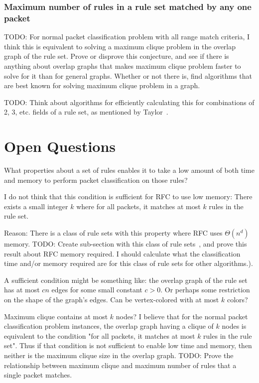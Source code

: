 \documentclass[acmsmall]{acmart}
\newcommand{\todo}[1]{}
\renewcommand{\todo}[1]{{\color{red} TODO: {#1}}}
\begin{document}
\subsubsection{Maximum number of rules in a rule set matched by any one packet}

\todo{For normal packet classification problem with all range match criteria, I think this is equivalent to solving a maximum clique problem in the overlap graph of the rule set.  Prove or disprove this conjecture, and see if there is anything about overlap graphs that makes maximum clique problem faster to solve for it than for general graphs.  Whether or not there is, find algorithms that are best known for solving maximum clique problem in a graph.}

\todo{Think about algorithms for efficiently calculating this for combinations of 2, 3, etc. fields of a rule set, as mentioned by Taylor~\cite[Sec 2.2]{TT2004b}.}


\section{Open Questions}

What properties about a set of rules enables it
to take a low amount of both time and memory to perform
packet classification on those rules?

I do not think that this condition is sufficient for RFC to use low memory:
There exists a small integer $k$ where for all packets,
it matches at most $k$ rules in the rule set.

Reason: There is a class of rule sets with this property where RFC uses
$\Theta(n^d)$ memory.
\todo{Create sub-section with this class of rule sets~\cite[Sec 4.2]{ASP1999},
and prove this result about RFC memory required.
I should calculate what the classification time and/or
memory required are for this class of rule sets for other algorithms.}).

A sufficient condition might be something like:
the overlap graph of the rule set has at most $cn$ edges for some small constant $c > 0$.
Or perhaps some restriction on the shape of the graph's edges.
Can be vertex-colored with at most $k$ colors?

Maximum clique contains at most $k$ nodes?
I believe that for the normal packet classification problem instances,
the overlap graph having a clique of $k$ nodes is
equivalent to the condition
"for all packets, it matches at most $k$ rules in the rule set".
Thus if that condition is not sufficient to enable low time and memory,
then neither is the maximum clique size in the overlap graph.
\todo{Prove the relationship between maximum clique and maximum number of
rules that a single packet matches.}
\end{document}
